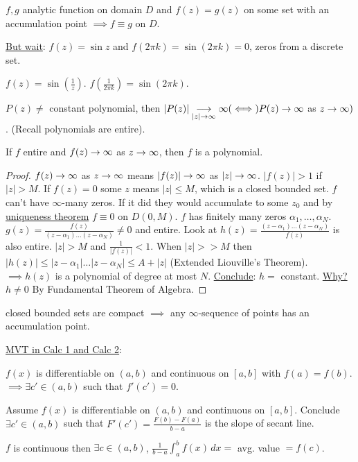 \documentclass[]{article}
\begin{document}
\begin{corollary}
	$f,g$ analytic function on domain $D$ and $f(z) = g(z)$ on some set with an accumulation point $\implies f\equiv g$ on $D$.
\end{corollary}
\underline{But wait}: $f(z) = \sin{z}$ and $f(2\pi k) = \sin(2\pi k) = 0$, zeros from a discrete set.
\begin{example}
	$f(z) = \sin{(\frac{1}{z})}$. $f(\frac{1}{2\pi k}) = \sin{(2\pi k)}$.
\end{example}
\begin{recall}
	 $P(z) \neq$ constant polynomial, then $|P(z)| \underset{|z|\rightarrow\infty}{\longrightarrow} \infty (\iff) P(z) \rightarrow \infty$ as $z\rightarrow \infty)$. (Recall polynomials are entire).
\end{recall}
\begin{theorem}
	If $f$ entire and $f(z) \rightarrow \infty$ as $z\rightarrow \infty$, then $f$ is a polynomial.
\end{theorem}
\begin{proof}
	$f(z)\rightarrow\infty$ as $z\rightarrow\infty$ means $|f(z)|\rightarrow\infty$ as $|z|\rightarrow\infty$. $|f(z)|>1$ if $|z|>M$. If $f(z) = 0$ some $z$ means $|z|\leq M$, which is a closed bounded set. $f$ can't have $\infty$-many zeros. If it did they would accumulate to some $z_0$ and by \underline{uniqueness theorem} $f\equiv 0$ on $D(0,M)$.
	$f$ has finitely many zeros $\alpha_1,\dots,\alpha_N$. $g(z) = \frac{f(z)}{(z-\alpha_1)\dots(z-\alpha_N)} \neq 0$ and entire. Look at $h(z) = \frac{(z-\alpha_1)\dots(z-\alpha_N)}{f(z)}$ is also entire. $|z|>M$ and $\frac{1}{|f(z)|}<1$. When $|z|>>M$ then $|h(z)|\leq |z-\alpha_1|\dots|z-\alpha_N|\leq A+|z|$ (Extended Liouville's Theorem). $\implies h(z)$ is a polynomial of degree at most $N$.
	\underline{Conclude}: $h = $ constant. \underline{Why?} $h\neq 0$ By Fundamental Theorem of Algebra.
\end{proof}
\begin{remark}
	[*] closed bounded sets are compact $\implies$ any $\infty$-sequence of points has an accumulation point.
\end{remark}

\underline{MVT in Calc 1 and Calc 2}:
\begin{recall}
	 $f(x)$ is differentiable on $(a,b)$ and continuous on $[a,b]$ with $f(a) = f(b)$. $\implies \exists c'\in(a,b)$ such that $f'(c') = 0$.
\end{recall}
\begin{recall}
	 Assume $f(x)$ is differentiable on $(a,b)$ and continuous on $[a,b]$. Conclude $\exists c'\in(a,b)$ such that $F'(c') = \frac{F(b)-F(a)}{b-a}$ is the slope of secant line.
\end{recall}
\begin{recall}
	 $f$ is continuous then $\exists c \in(a,b)$, $\frac{1}{b-a} \int_a^b f(x) \, dx = $ avg. value $ = f(c)$.
\end{recall}
\end{document}
